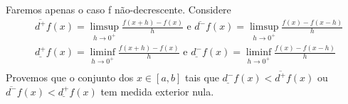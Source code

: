 \documentclass[Analysis/analysis_notes.tex]{subfiles}
\begin{document}
\begin{proof*}
	Faremos apenas o caso f não-decrescente. Considere
	\begin{align*}
		 & \overline{d^{+}}f(x) = \limsup_{h\to 0^{+}} \frac{f(x+h)-f(x)}{h}\text{ e }\overline{d^{-}}f(x) = \limsup_{h\to 0^{+}}\frac{f(x) - f(x-h)}{h}   \\
		 & \underline{d^{+}}f(x) = \liminf_{h\to 0^{+}} \frac{f(x+h)-f(x)}{h}\text{ e }\underline{d^{-}}f(x) = \liminf_{h\to 0^{+}}\frac{f(x) - f(x-h)}{h} \\
	\end{align*}
	Provemos que o conjunto dos \(x\in[a, b]\) tais que \(\underline{d^{-}}f(x) < \overline{d^{+}}f(x)\)
	ou \(\overline{d^{-}}f(x) < \underline{d^{+}}f(x)\) tem medida exterior nula.
\end{proof*}
\end{document}
